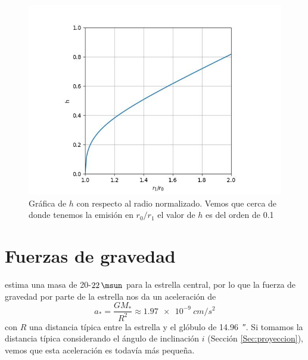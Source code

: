 \documentclass{book}
\begin{document}
\begin{figure}
    \centering
    \includegraphics{Appendices/h_3.jpg}
    \caption{Gráfica de $h$ con respecto al radio normalizado. Vemos que cerca de donde tenemos la emisión en $r_0/r_1$ el valor de $h$ es del orden de 0.1}
    \label{fig:h}
\end{figure}

\section{Fuerzas de gravedad} \label{F gravedad}

\cite{Hamann:2019} estima una masa  de 20-$\SI{22}{\msun}$ para la estrella central, por lo que la fuerza de gravedad por parte de la estrella nos da un aceleración de 
\[a_*=\frac{GM_*}{R^2}\approx \SI{1.97e-9}{cm/s^2}\] con $R$ una distancia típica entre la estrella y el glóbulo de \SI{14.96}{\arcsecond}. Si tomamos la distancia típica considerando el ángulo de inclinación $i$ (Sección \ref{Sec:proyeccion}), vemos que esta aceleración es todavía más pequeña.
\end{document}
